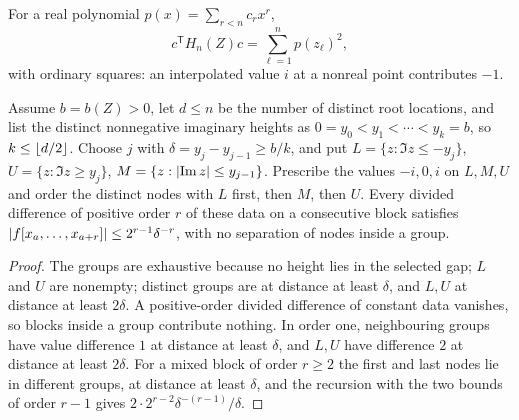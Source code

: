For a real polynomial $p(x)=\sum_{r<n}c_rx^r$,
\begin{equation}\label{li:eq:hquad}
 c^{\mathsf T}H_n(Z)c=\sum_{\ell=1}^np(z_\ell)^2 ,
\end{equation}
with ordinary squares: an interpolated value $i$ at a nonreal point contributes $-1$.

\begin{lemma}\label{li:lem:dd}
Assume $b=b(Z)>0$, let $d\le n$ be the number of distinct root locations, and list the distinct
nonnegative imaginary heights as $0=y_0<y_1<\cdots<y_k=b$, so $k\le\lfloor d/2\rfloor$. Choose $j$ with
$\delta=y_j-y_{j-1}\ge b/k$, and put $L=\{z:\Im z\le-y_j\}$, $U=\{z:\Im z\ge y_j\}$,
$M=\{z:\lvert\operatorname{Im} z\rvert\le y_{j-1}\}$. Prescribe the values $-i,0,i$ on $L,M,U$ and order the distinct
nodes with $L$ first, then $M$, then $U$. Every divided difference of positive order $r$ of these
data on a consecutive block satisfies $\lvert f[x_a,\dots,x_{a+r}]\rvert\le2^{r-1}\delta^{-r}$, with no
separation of nodes inside a group.
\end{lemma}

\begin{proof}
The groups are exhaustive because no height lies in the selected gap; $L$ and $U$ are nonempty;
distinct groups are at distance at least $\delta$, and $L,U$ at distance at least $2\delta$. A
positive-order divided difference of constant data vanishes, so blocks inside a group contribute
nothing. In order one, neighbouring groups have value difference $1$ at distance at least $\delta$,
and $L,U$ have difference $2$ at distance at least $2\delta$. For a mixed block of order $r\ge2$ the
first and last nodes lie in different groups, at distance at least $\delta$, and the recursion with
the two bounds of order $r-1$ gives $2\cdot2^{r-2}\delta^{-(r-1)}/\delta$.
\end{proof}


